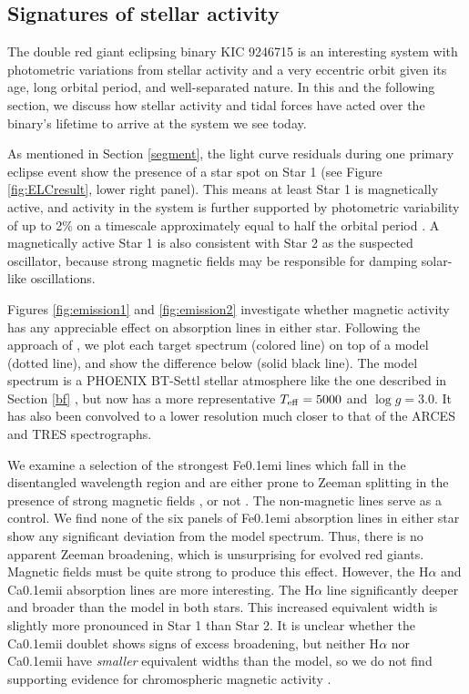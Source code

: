 \subsection{Signatures of stellar activity}\label{actrot}
The double red giant eclipsing binary KIC 9246715 is an interesting system with photometric variations from stellar activity and a very eccentric orbit given its age, long orbital period, and well-separated nature. In this and the following section, we discuss how stellar activity and tidal forces have acted over the binary's lifetime to arrive at the system we see today.

As mentioned in Section \ref{segment}, the light curve residuals during one primary eclipse event show the presence of a star spot on Star 1 (see Figure \ref{fig:ELCresult}, lower right panel). This means at least Star 1 is magnetically active, and activity in the system is further supported by photometric variability of up to 2\% on a timescale approximately equal to half the orbital period \citep{gau14}. A magnetically active Star 1 is also consistent with Star 2 as the suspected oscillator, because strong magnetic fields may be responsible for damping solar-like oscillations.

Figures \ref{fig:emission1} and \ref{fig:emission2} investigate whether magnetic activity has any appreciable effect on absorption lines in either star. Following the approach of \citet{fro12}, we plot each target spectrum (colored line) on top of a model (dotted line), and show the difference below (solid black line). The model spectrum is a PHOENIX BT-Settl stellar atmosphere like the one described in Section \ref{bf} \citep{all03,asp09}, but now has a more representative $T_{\rm{eff}} = 5000$ and $\log g = 3.0$. It has also been convolved to a lower resolution much closer to that of the ARCES and TRES spectrographs.

We examine a selection of the strongest {\rm Fe}\kern 0.1em{\sc i} lines which fall in the disentangled wavelength region and are either prone to Zeeman splitting in the presence of strong magnetic fields \citep{har73}, or not \citep{sis70}. The non-magnetic lines serve as a control. We find none of the six panels of {\rm Fe}\kern 0.1em{\sc i} absorption lines in either star show any significant deviation from the model spectrum. Thus, there is no apparent Zeeman broadening, which is unsurprising for evolved red giants. Magnetic fields must be quite strong to produce this effect. However, the H$\alpha$ and {\rm Ca}\kern 0.1em{\sc ii} absorption lines are more interesting. The H$\alpha$ line significantly deeper and broader than the model in both stars. This increased equivalent width is slightly more pronounced in Star 1 than Star 2. It is unclear whether the {\rm Ca}\kern 0.1em{\sc ii} doublet shows signs of excess broadening, but neither H$\alpha$ nor {\rm Ca}\kern 0.1em{\sc ii} have \emph{smaller} equivalent widths than the model, so we do not find supporting evidence for chromospheric magnetic activity \citep{fro12}.

  
  
  
  
  
  
  